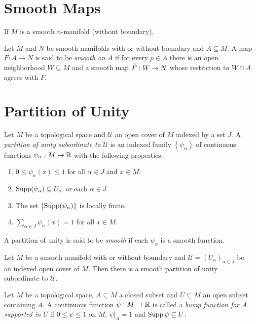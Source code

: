 \section{Smooth Maps}

\begin{definition}
    If $M$ is a smooth $n$-manifold (without boundary), 
\end{definition}

\begin{definition}
    Let $M$ and $N$ be smooth manifolds with or without boundary and $A\subseteq M$. A map $F:A\to N$ is said to be \emph{smooth on $A$} if for every $p\in A$ there is an open neighborhood $W\subseteq M$ and a smooth map $\widetilde{F}: W\to N$ whose restriction to $W\cap A$ agrees with $F$.
\end{definition}

\section{Partition of Unity}

\begin{definition}
    Let $M$ be a topological space and $\mathscr U$ an open cover of $M$ indexed by a set $J$. A \emph{partition of unity subordinate to $\mathscr U$} is an indexed family $(\psi_{\alpha})$ of continuous functions $\psi_\alpha: M\to\mathbb{R}$ with the following properties: 
    \begin{enumerate}
        \item $0\le\psi_\alpha(x)\le 1$ for all $\alpha\in J$ and $x\in M$. 
        \item $\operatorname{Supp}(\psi_\alpha)\subseteq U_\alpha$ or each $\alpha\in J$
        \item The set $\{\operatorname{Supp}(\psi_\alpha)\}$ is locally finite.
        \item $\sum_{\alpha\in J}\psi_\alpha(x) = 1$ for all $x\in M$.
    \end{enumerate} 
    A partition of unity is said to be \emph{smooth} if each $\psi_\alpha$ is a smooth function.
\end{definition}

\begin{theorem}
    Let $M$ be a smooth manifold with or without boundary and $\mathscr U = (U_\alpha)_{\alpha\in J}$ be an indexed open cover of $M$. Then there is a smooth partition of unity subordinate to $\mathscr U$.
\end{theorem}

\begin{definition}
    Let $M$ be a topological space, $A\subseteq M$ a closed subset and $U\subseteq M$ an open subset containing $A$. A continuous function $\psi: M\to\mathbb{R}$ is called a \emph{bump function for $A$ supported in $U$} if $0\le\psi\le 1$ on $M$, $\psi|_A = 1$ and $\operatorname{Supp}\psi\subseteq U$.
\end{definition}

